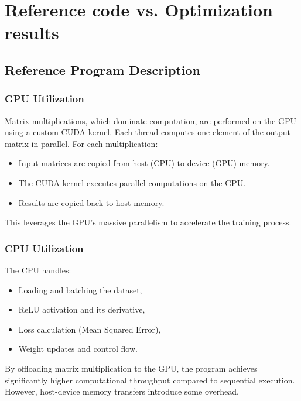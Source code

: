 \documentclass[conference, 12pt]{IEEEtran}
\begin{document}
\section{Reference code vs. Optimization results}

\subsection{Reference Program Description}

\subsubsection*{GPU Utilization}

Matrix multiplications, which dominate computation, are performed on the GPU using a custom CUDA kernel. 
Each thread computes one element of the output matrix in parallel. 
For each multiplication:
\begin{itemize}
    \item Input matrices are copied from host (CPU) to device (GPU) memory.
    \item The CUDA kernel executes parallel computations on the GPU.
    \item Results are copied back to host memory.
\end{itemize}
This leverages the GPU’s massive parallelism to accelerate the training process.

\subsubsection*{CPU Utilization}

The CPU handles:
\begin{itemize}
    \item Loading and batching the dataset,
    \item ReLU activation and its derivative,
    \item Loss calculation (Mean Squared Error),
    \item Weight updates and control flow.
\end{itemize}

By offloading matrix multiplication to the GPU, the program achieves significantly higher computational throughput 
compared to sequential execution. However, host-device memory transfers introduce some overhead.
\end{document}
